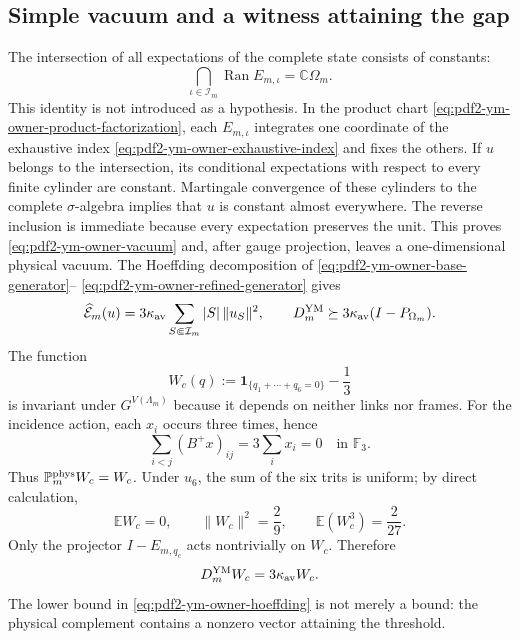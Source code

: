 \subsection{Simple vacuum and a witness attaining the gap}

The intersection of all expectations of the complete state consists of constants:
\begin{equation}\label{eq:pdf2-ym-owner-vacuum}
 \bigcap_{\iota\in\mathcal I_m}\operatorname{Ran}E_{m,\iota}
 =\mathbb C\Omega_m.
\end{equation}
This identity is not introduced as a hypothesis. In the product chart
\eqref{eq:pdf2-ym-owner-product-factorization}, each $E_{m,\iota}$ integrates one
coordinate of the exhaustive index
\eqref{eq:pdf2-ym-owner-exhaustive-index} and fixes the others. If
$u$ belongs to the intersection, its conditional expectations with respect to every
finite cylinder are constant. Martingale convergence of these cylinders to the
complete $\sigma$-algebra implies that $u$ is constant almost everywhere. The reverse
inclusion is immediate because every expectation preserves the unit. This proves
\eqref{eq:pdf2-ym-owner-vacuum} and, after gauge projection, leaves a one-dimensional
physical vacuum.
The Hoeffding decomposition of
\eqref{eq:pdf2-ym-owner-base-generator}--
\eqref{eq:pdf2-ym-owner-refined-generator} gives
\begin{equation}\label{eq:pdf2-ym-owner-hoeffding}
 \widehat{\mathcal E}_m(u)
 =3\kappa_{\rm av}\sum_{S\Subset\mathcal I_m}|S|\,\|u_S\|^2,
 \qquad
 D_m^{\rm YM}\succeq
 3\kappa_{\rm av}(I-P_{\Omega_m}).
\end{equation}
The function
\begin{equation}\label{eq:pdf2-ym-owner-wc}
 W_c(q):=\mathbf1_{\{q_1+\cdots+q_6=0\}}-\frac13
\end{equation}
is invariant under $G^{V(\Lambda_m)}$ because it depends on neither links nor frames. For
the incidence action, each $x_i$ occurs three times, hence
\begin{equation}\label{eq:pdf2-ym-owner-wc-invariance}
 \sum_{i<j}(B^+x)_{ij}=3\sum_i x_i=0
 \quad\text{in }\mathbb F_3.
\end{equation}
Thus $\mathbb P_m^{\rm phys}W_c=W_c$. Under $u_6$, the sum of the six trits is
uniform; by direct calculation,
\begin{equation}\label{eq:pdf2-ym-owner-wc-moments}
 \mathbb EW_c=0,\qquad
 \|W_c\|^2=\frac29,\qquad
 \mathbb E(W_c^3)=\frac2{27}.
\end{equation}
Only the projector $I-E_{m,q_c}$ acts nontrivially on $W_c$. Therefore
\begin{equation}\label{eq:pdf2-ym-owner-wc-eigenvalue}
 D_m^{\rm YM}W_c=3\kappa_{\rm av}W_c.
\end{equation}
The lower bound in \eqref{eq:pdf2-ym-owner-hoeffding} is not merely a bound: the
physical complement contains a nonzero vector attaining the threshold.

